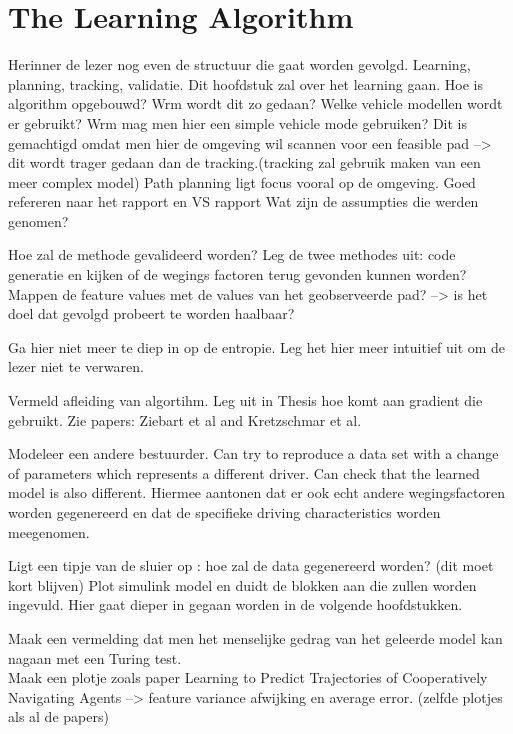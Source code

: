 \chapter{The Learning Algorithm\\}
\label{cha:2}
Herinner de lezer nog even de structuur die gaat worden gevolgd. 
Learning, planning, tracking, validatie.
Dit hoofdstuk zal over het learning gaan.
Hoe is algorithm opgebouwd? Wrm wordt dit zo gedaan?
Welke vehicle modellen wordt er gebruikt? Wrm mag men hier een simple vehicle mode gebruiken?
Dit is gemachtigd omdat men hier de omgeving wil scannen voor een feasible pad --> dit wordt trager gedaan dan de tracking.(tracking zal gebruik maken van een meer complex model) Path planning ligt focus vooral op de omgeving.
Goed refereren naar het rapport en VS rapport
Wat zijn de assumpties die werden genomen?

Hoe zal de methode gevalideerd worden? Leg de twee methodes uit: code generatie en kijken of de wegings factoren terug gevonden kunnen worden? Mappen de feature values met de values van het geobserveerde pad? --> is het doel dat gevolgd probeert te worden haalbaar? 

Ga hier niet meer te diep in op de entropie. Leg het hier meer intuitief uit om de lezer niet te verwaren. 

Vermeld afleiding van algortihm. Leg uit in Thesis hoe komt aan gradient die gebruikt. Zie papers: Ziebart et al and Kretzschmar et al.

Modeleer een andere bestuurder. Can try to reproduce a data set with a change of parameters which represents a different driver. Can check that the learned model is also different. Hiermee aantonen dat er ook echt andere wegingsfactoren worden gegenereerd en dat de specifieke driving characteristics worden meegenomen.

Ligt een tipje van de sluier op : hoe zal de data gegenereerd worden? (dit moet kort blijven)
Plot simulink model en duidt de blokken aan die zullen worden ingevuld. Hier gaat dieper in gegaan worden in de volgende hoofdstukken. 

Maak een vermelding dat men het menselijke gedrag van het geleerde model kan nagaan met een Turing test.\\

Maak een plotje zoals paper Learning to Predict Trajectories of Cooperatively Navigating Agents --> feature variance afwijking en average error. (zelfde plotjes als al de papers)



